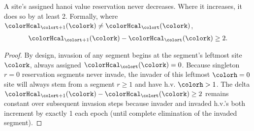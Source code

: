 \begin{lemma}
\label{thm:tilted-invader-minus-invaded}
A site's assigned hanoi value reservation never decreases.
Where it increases, it does so by at least 2.
Formally, where $\colorHcal_{\colort + 1}(\colork) \neq \colorHcal_{\colort}(\colork)$,
\begin{align*}
\colorHcal_{\colort + 1}(\colork) - \colorHcal_{\colort}(\colork) \geq 2.
\end{align*}
\end{lemma}

\begin{proof}
By design, invasion of any segment begins at the segment's leftmost site $\colork$, always assigned $\colorHcal_{\colort}(\colork) = 0$.
Because singleton $r=0$ reservation segments never invade, the invader of this leftmost $\colorh = 0$ site will always stem from a segment $r \geq 1$ and have h.v. $\colorh > 1$.
The delta $\colorHcal_{\colort + 1}(\colork) - \colorHcal_{\colort}(\colork) \geq 2$ remains constant over subsequent invasion steps because invader and invaded h.v.'s both increment by exactly 1 each epoch (until complete elimination of the invaded segment).
\end{proof}
